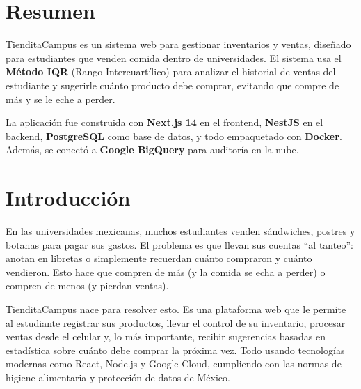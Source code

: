 \documentclass[12pt, a4paper]{article}
\begin{document}
\newpage
{}
\tableofcontents
\newpage
\listoffigures
\newpage
\listoftables

\newpage
{}
\setcounter{page}{1}

\section{Resumen}
TienditaCampus es un sistema web para gestionar inventarios y ventas, diseñado para estudiantes que venden comida dentro de universidades. El sistema usa el \textbf{Método IQR} (Rango Intercuartílico) para analizar el historial de ventas del estudiante y sugerirle cuánto producto debe comprar, evitando que compre de más y se le eche a perder.

La aplicación fue construida con \textbf{Next.js 14} en el frontend, \textbf{NestJS} en el backend, \textbf{PostgreSQL} como base de datos, y todo empaquetado con \textbf{Docker}. Además, se conectó a \textbf{Google BigQuery} para auditoría en la nube.

\section{Introducción}
En las universidades mexicanas, muchos estudiantes venden sándwiches, postres y botanas para pagar sus gastos. El problema es que llevan sus cuentas ``al tanteo'': anotan en libretas o simplemente recuerdan cuánto compraron y cuánto vendieron. Esto hace que compren de más (y la comida se echa a perder) o compren de menos (y pierdan ventas).

TienditaCampus nace para resolver esto. Es una plataforma web que le permite al estudiante registrar sus productos, llevar el control de su inventario, procesar ventas desde el celular y, lo más importante, recibir sugerencias basadas en estadística sobre cuánto debe comprar la próxima vez. Todo usando tecnologías modernas como React, Node.js y Google Cloud, cumpliendo con las normas de higiene alimentaria y protección de datos de México.

\end{document}
